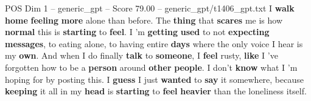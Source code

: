 \begin{textsample}{POS Dim 1 – generic\_gpt – Score 79.00 – generic\_gpt/t1406\_gpt.txt}
I \textbf{walk} \textbf{home} \textbf{feeling} \textbf{more} alone than before.
The \textbf{thing} that \textbf{scares} me is how \textbf{normal} this is \textbf{starting} to \textbf{feel}.
I ’m \textbf{getting} \textbf{used} to not \textbf{expecting} \textbf{messages}, to eating alone, to having entire \textbf{days} where the only voice I hear is my \textbf{own}.
And when I do finally \textbf{talk} to \textbf{someone}, I \textbf{feel} rusty, \textbf{like} I ’ve forgotten how to be a \textbf{person} around \textbf{other} \textbf{people}.
I don't \textbf{know} what I ’m hoping for by posting this.
I \textbf{guess} I just \textbf{wanted} to \textbf{say} it somewhere, because \textbf{keeping} it all in my \textbf{head} is \textbf{starting} to \textbf{feel} \textbf{heavier} than the loneliness itself.

\end{textsample}
